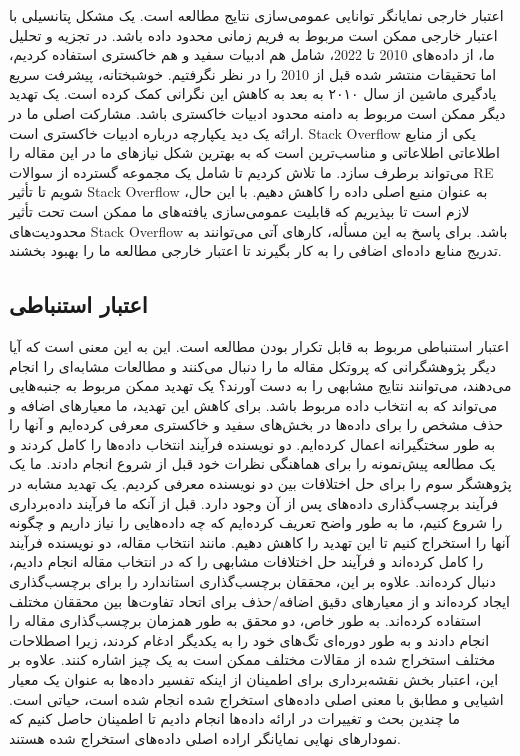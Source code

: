 \documentclass[a4paper,10pt]{article}
\begin{document}
            اعتبار خارجی نمایانگر توانایی عمومی‌سازی نتایج مطالعه است. یک مشکل پتانسیلی با اعتبار خارجی ممکن است مربوط به فریم زمانی محدود داده باشد. در تجزیه و تحلیل ما، از داده‌های 2010 تا 2022، شامل هم ادبیات سفید و هم خاکستری استفاده کردیم، اما تحقیقات منتشر شده قبل از 2010 را در نظر نگرفتیم. خوشبختانه، پیشرفت سریع یادگیری ماشین از سال ۲۰۱۰ به بعد به کاهش این نگرانی کمک کرده است. یک تهدید دیگر ممکن است مربوط به دامنه محدود ادبیات خاکستری باشد. مشارکت اصلی ما در ارائه یک دید یکپارچه درباره ادبیات خاکستری است. Stack Overflow یکی از منابع اطلاعاتی اطلاعاتی و مناسب‌ترین است که به بهترین شکل نیازهای ما در این مقاله را می‌تواند برطرف سازد. ما تلاش کردیم تا شامل یک مجموعه گسترده از سوالات RE شویم تا تأثیر Stack Overflow به عنوان منبع اصلی داده را کاهش دهیم. با این حال، لازم است تا بپذیریم که قابلیت عمومی‌سازی یافته‌های ما ممکن است تحت تأثیر محدودیت‌های Stack Overflow باشد. برای پاسخ به این مسأله، کارهای آتی می‌توانند به تدریج منابع داده‌ای اضافی را به کار بگیرند تا اعتبار خارجی مطالعه ما را بهبود بخشند.

        \subsection{اعتبار استنباطی}

            اعتبار استنباطی مربوط به قابل تکرار بودن مطالعه است. این به این معنی است که آیا دیگر پژوهشگرانی که پروتکل مقاله ما را دنبال می‌کنند و مطالعات مشابه‌ای را انجام می‌دهند، می‌توانند نتایج مشابهی را به دست آورند؟ یک تهدید ممکن مربوط به جنبه‌هایی می‌تواند که به انتخاب داده مربوط باشد. برای کاهش این تهدید، ما معیارهای اضافه و حذف مشخص را برای داده‌ها در بخش‌های سفید و خاکستری معرفی کرده‌ایم و آنها را به طور سختگیرانه اعمال کرده‌ایم. دو نویسنده فرآیند انتخاب داده‌ها را کامل کردند و یک مطالعه پیش‌نمونه را برای هماهنگی نظرات خود قبل از شروع انجام دادند. ما یک پژوهشگر سوم را برای حل اختلافات بین دو نویسنده معرفی کردیم. یک تهدید مشابه در فرآیند برچسب‌گذاری داده‌های پس از آن وجود دارد. قبل از آنکه ما فرآیند داده‌برداری را شروع کنیم، ما به طور واضح تعریف کرده‌ایم که چه داده‌هایی را نیاز داریم و چگونه آنها را استخراج کنیم تا این تهدید را کاهش دهیم. مانند انتخاب مقاله، دو نویسنده فرآیند را کامل کرده‌اند و فرآیند حل اختلافات مشابهی را که در انتخاب مقاله انجام دادیم، دنبال کرده‌اند. علاوه بر این، محققان برچسب‌گذاری استاندارد را برای برچسب‌گذاری ایجاد کرده‌اند و از معیارهای دقیق اضافه/حذف برای اتحاد تفاوت‌ها بین محققان مختلف استفاده کرده‌اند. به طور خاص، دو محقق به طور همزمان برچسب‌گذاری مقاله را انجام دادند و به طور دوره‌ای تگ‌های خود را به یکدیگر ادغام کردند، زیرا اصطلاحات مختلف استخراج شده از مقالات مختلف ممکن است به یک چیز اشاره کنند. علاوه بر این، اعتبار بخش نقشه‌برداری برای اطمینان از اینکه تفسیر داده‌ها به عنوان یک معیار اشیایی و مطابق با معنی اصلی داده‌های استخراج شده انجام شده است، حیاتی است. ما چندین بحث و تغییرات در ارائه داده‌ها انجام دادیم تا اطمینان حاصل کنیم که نمودارهای نهایی نمایانگر اراده اصلی داده‌های استخراج شده هستند.
\end{document}
